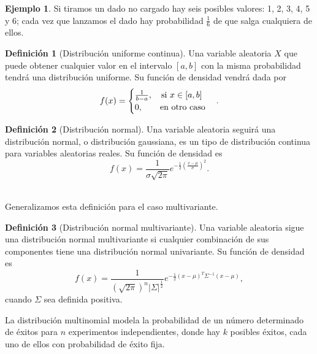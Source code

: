 \documentclass[10pt,a4paper]{article} %
\theoremstyle{definition}
\newtheorem{definition}{Definición}[section]
\newtheorem{example}[theorem]{Ejemplo}
\begin{document}
\begin{example}
  Si tiramos un dado no cargado hay seis posibles valores: 1, 2, 3, 4, 5 y 6; cada vez que lanzamos el dado hay probabilidad $\frac{1}{6}$ de que salga cualquiera de ellos.
\end{example}

\begin{definition}[Distribución uniforme continua]
  Una variable aleatoria $X$ que puede obtener cualquier valor en el intervalo $[a,b]$ con la misma probabilidad tendrá una distribución uniforme. Su función de densidad vendrá dada por \[
f(x) = 
\begin{cases}
  \frac{1}{b-a},\quad \text{si } x\in [a,b]\\
  0,\quad\quad \text{en otro caso}
\end{cases}.\\
  \]
\end{definition}

\begin{definition}[Distribución normal]
  Una variable aleatoria seguirá una distribución normal, o distribución gaussiana, es un tipo de distribución continua para variables aleatorias reales. Su función de densidad es \[
f(x) = \frac{1}{\sigma\sqrt{2\pi}}e^{-\frac{1}{2}\left( \frac{x-\mu}{\sigma}\right ) ^2}.
\]\\
\end{definition}

Generalizamos esta definición para el caso multivariante.
\begin{definition}[Distribución normal multivariante]
  Una variable aleatoria sigue una distribución normal multivariante si cualquier combinación de sus componentes tiene una distribución normal univariante. Su función de densidad es \[
f(x) = \frac{1}{\left (\sqrt{2\pi}\right )^n |\Sigma|^{\frac{1}{2}}} e^{-\frac{1}{2}(x-\mu)^T\Sigma^{-1}(x-\mu)},
  \] cuando $\Sigma$ sea definida positiva.\\
\end{definition}

La distribución multinomial modela la probabilidad de un número determinado de éxitos para $n$ experimentos independientes, donde hay $k$ posibles éxitos, cada uno de ellos con probabilidad de éxito fija.
\end{document}
